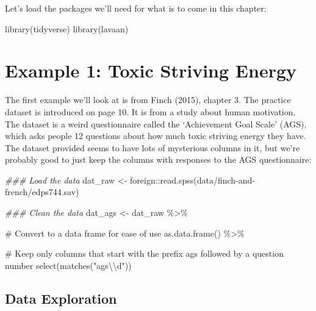 \documentclass[
  letterpaper,
  DIV=11,
  numbers=noendperiod]{scrreprt}
\newenvironment{Shaded}{\begin{snugshade}}{\end{snugshade}}
\newcommand{\CommentTok}[1]{\textcolor[rgb]{0.37,0.37,0.37}{#1}}
\newcommand{\DocumentationTok}[1]{\textcolor[rgb]{0.37,0.37,0.37}{\textit{#1}}}
\newcommand{\FunctionTok}[1]{\textcolor[rgb]{0.28,0.35,0.67}{#1}}
\newcommand{\NormalTok}[1]{\textcolor[rgb]{0.00,0.23,0.31}{#1}}
\newcommand{\OtherTok}[1]{\textcolor[rgb]{0.00,0.23,0.31}{#1}}
\newcommand{\SpecialCharTok}[1]{\textcolor[rgb]{0.37,0.37,0.37}{#1}}
\newcommand{\StringTok}[1]{\textcolor[rgb]{0.13,0.47,0.30}{#1}}
\begin{document}
Let's load the packages we'll need for what is to come in this chapter:

\begin{Shaded}
\begin{Highlighting}[]
\FunctionTok{library}\NormalTok{(tidyverse)}
\FunctionTok{library}\NormalTok{(lavaan)}
\end{Highlighting}
\end{Shaded}

\hypertarget{example-1-toxic-striving-energy}{%
\section{Example 1: Toxic Striving
Energy}\label{example-1-toxic-striving-energy}}

The first example we'll look at is from Finch (2015), chapter 3. The
practice dataset is introduced on page 10. It is from a study about
human motivation. The dataset is a weird questionnaire called the
`Achievement Goal Scale' (AGS), which asks people 12 questions about how
much toxic striving energy they have. The dataset provided seems to have
lots of mysterious columns in it, but we're probably good to just keep
the columns with responses to the AGS questionnaire:

\begin{Shaded}
\begin{Highlighting}[]
\DocumentationTok{\#\#\# Load the data}
\NormalTok{dat\_raw }\OtherTok{\textless{}{-}}\NormalTok{ foreign}\SpecialCharTok{::}\FunctionTok{read.spss}\NormalTok{(}\StringTok{\textquotesingle{}data/finch{-}and{-}french/edps744.sav\textquotesingle{}}\NormalTok{) }
  
\DocumentationTok{\#\#\# Clean the data}
\NormalTok{dat\_ags }\OtherTok{\textless{}{-}}\NormalTok{ dat\_raw }\SpecialCharTok{\%\textgreater{}\%} 

  \CommentTok{\# Convert to a data frame for ease of use}
  \FunctionTok{as.data.frame}\NormalTok{() }\SpecialCharTok{\%\textgreater{}\%} 
  
  \CommentTok{\# Keep only columns that start with the prefix \textquotesingle{}ags\textquotesingle{} followed by a question number}
  \FunctionTok{select}\NormalTok{(}\FunctionTok{matches}\NormalTok{(}\StringTok{"ags}\SpecialCharTok{\textbackslash{}\textbackslash{}}\StringTok{d"}\NormalTok{)) }
\end{Highlighting}
\end{Shaded}

\hypertarget{data-exploration}{%
\subsection{Data Exploration}\label{data-exploration}}
\end{document}
